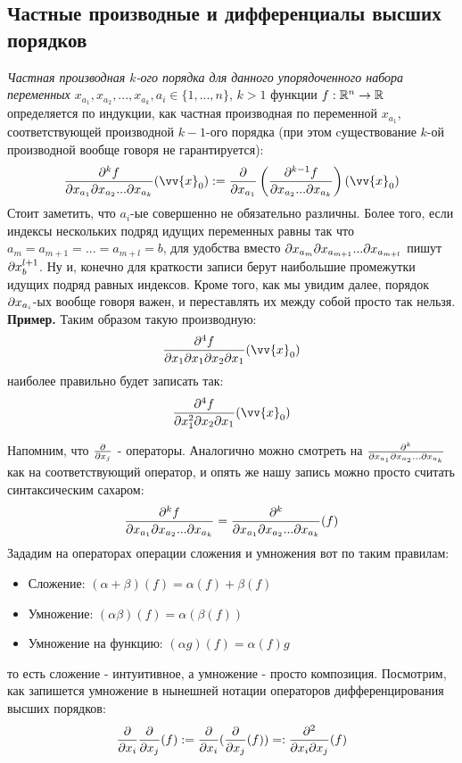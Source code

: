 \subsection{Частные производные и дифференциалы высших порядков}

\begin{definition}
	\textit{Частная производная $k$-ого порядка для  данного упорядоченного набора переменных $x_{a_1},x_{a_2},...,x_{a_k}, a_i\in\{1,...,n\}$}, $k>1$ функции $f:\mathbb{R}^n\to\mathbb{R}$ определяется по индукции, как частная производная по переменной $x_{a_1}$, соответствующей производной $k-1$-ого порядка (при  этом cуществование $k$-ой производной вообще говоря не гарантируется):
	\[
		\frac{\vdelta^k f}{\vdelta x_{a_1} \vdelta x_{a_2}...\vdelta x_{a_k}} (\vv{x}_0) := \pd{}{x_{a_1}}\left(\frac{\vdelta^{k-1} f}{\vdelta x_{a_2} ...\vdelta x_{a_k}} \right)(\vv{x}_0)
	\]
	Стоит заметить, что $a_i$-ые совершенно не обязательно различны. Более того, если индексы нескольких подряд идущих переменных равны так что $a_m = a_{m+1}=...=a_{m+l} = b$, для удобства вместо $\partial x_{a_m} \partial x_{a_{m+1}}...\partial x_{a_{m+l}}$ пишут $\partial x_b^{l+1}$. Ну и, конечно для краткости записи берут наибольшие промежутки идущих подряд равных индексов. Кроме того, как мы увидим далее, порядок $\partial x_{a_i}$-ых вообще говоря важен, и переставлять их между собой просто так нельзя.\\
	\textbf{Пример.} Таким образом такую производную:
	\[
		\frac{\vdelta^4 f}{\vdelta x_{1} \vdelta x_{1}\vdelta x_{2}\vdelta x_{1}} (\vv{x}_0)
	\]
	наиболее правильно будет записать так:
	\[
	\frac{\vdelta^4 f}{\vdelta x_{1}^2 \vdelta x_{2}\vdelta x_{1}} (\vv{x}_0)
	\]
	\begin{anote}
		Напомним, что $\frac{\partial }{\partial x_j}$ - операторы. Аналогично можно смотреть на $	\frac{\partial^k }{\partial x_{a_1} \partial x_{a_2}...\partial x_{a_k}}$ как на соответствующий оператор, и опять же нашу запись можно просто считать синтаксическим сахаром: 
		\[
				\frac{\partial^k f}{\partial x_{a_1} \partial x_{a_2}...\partial x_{a_k}} = 	\frac{\partial^k }{\partial x_{a_1} \partial x_{a_2}...\partial x_{a_k}}(f)
		\]
		 Зададим на операторах операции сложения и умножения вот по таким правилам:
		\begin{itemize}
			\item Сложение: $(\alpha + \beta)(f) = \alpha(f) +\beta(f)$
			\item Умножение: $(\alpha  \beta)(f) = \alpha( \beta(f))$
			\item Умножение на функцию: $(\alpha g)(f) = \alpha(f)g$
		\end{itemize}
	то есть сложение - интуитивное, а умножение - просто композиция. Посмотрим, как запишется умножение в нынешней нотации операторов дифференцирования высших порядков:
	\[
	\frac{\partial }{\partial x_i}\frac{\partial }{\partial x_j}(f) := \frac{\partial }{\partial x_i}(\frac{\partial }{\partial x_j}(f)) =:\frac{\partial^2}{\partial x_i \partial x_j}(f)
	\]
	

\end{anote}
\end{definition}
